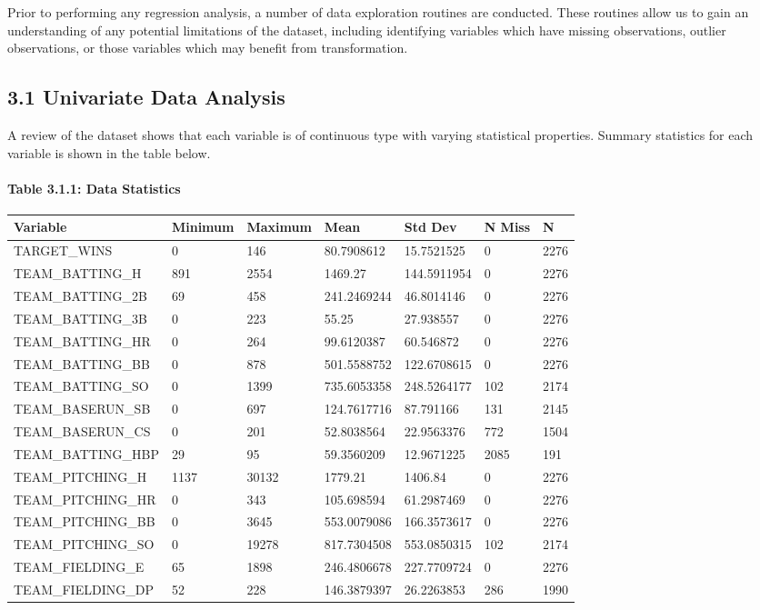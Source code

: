 \documentclass[]{article}
\let\oldparagraph\paragraph
\renewcommand{\paragraph}[1]{\oldparagraph{#1}\mbox{}}
\begin{document}
Prior to performing any regression analysis, a number of data
exploration routines are conducted. These routines allow us to gain an
understanding of any potential limitations of the dataset, including
identifying variables which have missing observations, outlier
observations, or those variables which may benefit from transformation.

\subsection{3.1 Univariate Data
Analysis}\label{univariate-data-analysis}

A review of the dataset shows that each variable is of continuous type
with varying statistical properties. Summary statistics for each
variable is shown in the table below.

\paragraph{Table 3.1.1: Data
Statistics}\label{table-3.1.1-data-statistics}

\begin{longtable}[]{@{}lllllll@{}}
\toprule
Variable & Minimum & Maximum & Mean & Std Dev & N Miss &
N\tabularnewline
\midrule
\endhead
TARGET\_WINS & 0 & 146 & 80.7908612 & 15.7521525 & 0 &
2276\tabularnewline
TEAM\_BATTING\_H & 891 & 2554 & 1469.27 & 144.5911954 & 0 &
2276\tabularnewline
TEAM\_BATTING\_2B & 69 & 458 & 241.2469244 & 46.8014146 & 0 &
2276\tabularnewline
TEAM\_BATTING\_3B & 0 & 223 & 55.25 & 27.938557 & 0 &
2276\tabularnewline
TEAM\_BATTING\_HR & 0 & 264 & 99.6120387 & 60.546872 & 0 &
2276\tabularnewline
TEAM\_BATTING\_BB & 0 & 878 & 501.5588752 & 122.6708615 & 0 &
2276\tabularnewline
TEAM\_BATTING\_SO & 0 & 1399 & 735.6053358 & 248.5264177 & 102 &
2174\tabularnewline
TEAM\_BASERUN\_SB & 0 & 697 & 124.7617716 & 87.791166 & 131 &
2145\tabularnewline
TEAM\_BASERUN\_CS & 0 & 201 & 52.8038564 & 22.9563376 & 772 &
1504\tabularnewline
TEAM\_BATTING\_HBP & 29 & 95 & 59.3560209 & 12.9671225 & 2085 &
191\tabularnewline
TEAM\_PITCHING\_H & 1137 & 30132 & 1779.21 & 1406.84 & 0 &
2276\tabularnewline
TEAM\_PITCHING\_HR & 0 & 343 & 105.698594 & 61.2987469 & 0 &
2276\tabularnewline
TEAM\_PITCHING\_BB & 0 & 3645 & 553.0079086 & 166.3573617 & 0 &
2276\tabularnewline
TEAM\_PITCHING\_SO & 0 & 19278 & 817.7304508 & 553.0850315 & 102 &
2174\tabularnewline
TEAM\_FIELDING\_E & 65 & 1898 & 246.4806678 & 227.7709724 & 0 &
2276\tabularnewline
TEAM\_FIELDING\_DP & 52 & 228 & 146.3879397 & 26.2263853 & 286 &
1990\tabularnewline
\bottomrule
\end{longtable}
\end{document}
